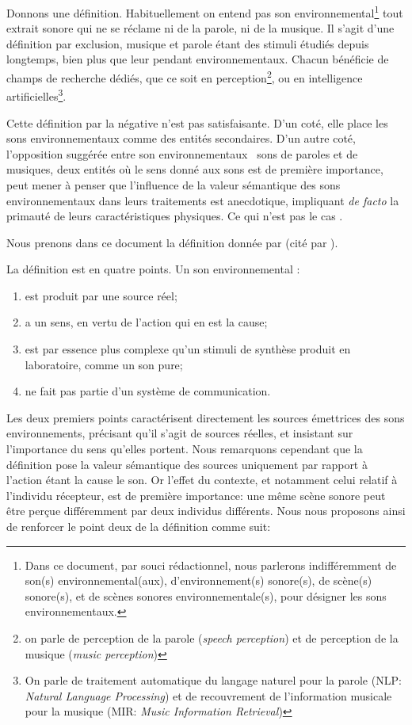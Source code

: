 Donnons une définition. Habituellement on entend pas son environnemental\footnote{Dans ce document, par souci rédactionnel, nous parlerons indifféremment de son(s) environnemental(aux), d'environnement(s) sonore(s), de scène(s) sonore(s), et de scènes sonores environnementale(s), pour désigner les sons environnementaux.} tout extrait sonore qui ne se  réclame ni de la parole, ni de la musique. Il s'agit d'une définition par exclusion, musique et parole étant des stimuli étudiés depuis longtemps, bien plus que leur pendant environnementaux. Chacun bénéficie de champs de recherche dédiés, que ce soit en perception\footnote{on parle de perception de la parole (\emph{speech perception}) et de perception de la musique (\emph{music perception})}, ou en intelligence artificielles\footnote{On parle de traitement automatique du langage naturel pour la parole (NLP: \emph{Natural Language Processing}) et de recouvrement de l'information musicale pour la musique (MIR: \emph{Music Information Retrieval})}.

Cette définition par la négative n'est pas satisfaisante. D'un coté, elle place les sons environnementaux comme des entités secondaires. D'un autre coté, l'opposition suggérée entre son environnementaux \vs~sons de paroles et de musiques, deux entités où le sens donné aux sons est de première importance, peut mener à penser que l'influence de la valeur sémantique des sons environnementaux dans leurs traitements est anecdotique, impliquant \emph{de facto} la primauté de leurs caractéristiques physiques. Ce qui n'est pas le cas \citep{ballas1987interpreting}. 

Nous prenons dans ce document la définition donnée par \cite{vanderveer1980ecological} (cité par \cite{ballas1987interpreting}).

La définition est en quatre points. Un son environnemental :

\begin{enumerate}
\item est produit par une source réel;
\item a un sens, en vertu de l'action qui en est la cause;
\item est par essence plus complexe qu'un stimuli de synthèse produit en laboratoire, comme un son pure;
\item ne fait pas partie d'un système de communication.
\end{enumerate} 

Les deux premiers points caractérisent directement les sources émettrices des sons environnements, précisant qu'il s'agit de sources réelles, et insistant sur l'importance du sens qu'elles portent. Nous remarquons cependant que la définition pose la valeur sémantique des sources uniquement par rapport à l'action étant la cause le son. Or l'effet du contexte, et notamment celui relatif à l'individu récepteur, est de première importance: une même scène sonore peut être perçue différemment par deux individus différents. Nous nous proposons ainsi de renforcer le point deux de la définition comme suit:

